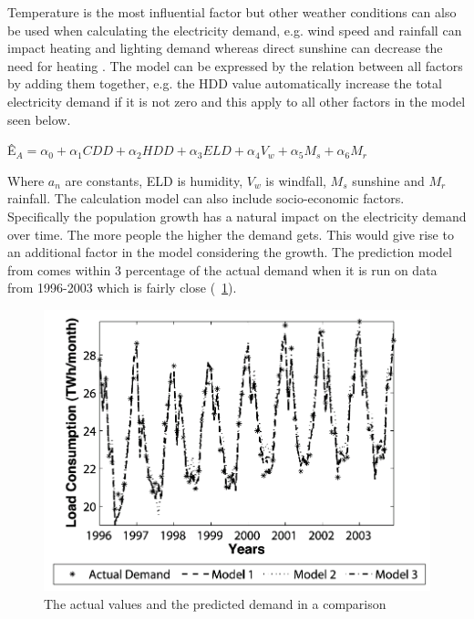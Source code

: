 \documentclass[twoside,11pt,openright]{report}
\begin{document}
Temperature is the most influential factor but other weather conditions can also be used when calculating the electricity demand, e.g. wind speed and rainfall can impact heating and lighting demand whereas direct sunshine can decrease the need for heating \cite{19}. The model can be expressed by the relation between all factors by adding them together, e.g. the HDD value automatically increase the total electricity demand if it is not zero and this apply to all other factors in the model seen below.

\begin{center} \^E$_{A}=\alpha_{0}+\alpha_{1}CDD+\alpha_{2}HDD+\alpha_{3}ELD
+\alpha_{4}V_{w}+\alpha_{5}M_{s}+\alpha_{6}M_{r}$ 
\end{center} 
 
Where $a_{n}$ are constants, ELD is humidity, $V_{w}$ is windfall, $M_{s}$ sunshine and $M_{r}$ rainfall.
The calculation model can also include socio-economic factors. Specifically the population growth has a natural impact on the electricity demand over time. The more people the higher the demand gets. This would give rise to an additional factor in the model considering the growth. The prediction model from \cite{19} comes within 3 percentage of the actual demand when it is run on data from 1996-2003 which is fairly close (~\ref{fig:predicteddemand}).
\newline
\begin{figure}[h!]
\centering
\includegraphics[width=0.8\linewidth,natwidth=898,natheight=587]{billeder/PredictionOfDemand.png}
\caption{The actual values and the predicted demand in a comparison \cite{19}}
\label{fig:predicteddemand}
\end{figure}
\end{document}
